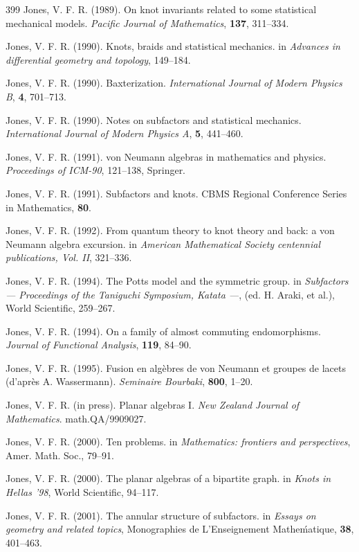 \documentclass[12pt]{article}
\theoremstyle{plain}
\theoremstyle{definition}
\numberwithin{equation}{section}
\begin{document}
\begin{thebibliography} {399}
Jones, V. F. R. (1989).
On knot invariants related to some statistical mechanical models. 
{\em Pacific Journal of Mathematics}, {\bf 137}, 311--334.

Jones, V. F. R. (1990).
Knots, braids and statistical mechanics.
in {\em Advances in differential geometry and topology}, 149--184.

Jones, V. F. R. (1990).
Baxterization.
{\em International Journal of Modern Physics B}, 
{\bf 4}, 701--713.

Jones, V. F. R. (1990).
Notes on subfactors and statistical mechanics.
{\em International Journal of Modern Physics A}, 
{\bf 5}, 441--460.

Jones, V. F. R. (1991).
von Neumann algebras in mathematics and physics.
{\em Proceedings of ICM-90}, 121--138, Springer.

Jones, V. F. R. (1991).
Subfactors and knots.
CBMS Regional Conference Series in Mathematics, 
{\bf 80}.

Jones, V. F. R. (1992).
From quantum theory to knot theory and back:  a von
Neumann algebra  excursion. 
in {\em American Mathematical Society centennial publications, Vol.  II}, 
321--336.

Jones, V. F. R. (1994).
The Potts model and the symmetric group.
in {\em Subfactors ---
Proceedings of the Taniguchi Symposium, Katata ---},
(ed. H. Araki, et al.),
World Scientific, 259--267.

Jones, V. F. R. (1994).
On a family of almost commuting endomorphisms.
{\em Journal of Functional Analysis}, {\bf 119}, 84--90.

Jones, V. F. R. (1995).
Fusion en alg\`ebres de von Neumann et groupes de lacets
(d'apr\`es A. Wassermann).
{\em Seminaire Bourbaki}, 
{\bf 800}, 1--20.

Jones, V. F. R. (in press).
Planar algebras I.
{\em New Zealand Journal of Mathematics}.
math.QA/9909027.

Jones, V. F. R. (2000).
Ten problems.
in {\em Mathematics: frontiers and perspectives},
Amer. Math. Soc., 79--91.

Jones, V. F. R. (2000).
The planar algebras of a bipartite graph.
in {\em Knots in Hellas '98}, World Scientific, 94--117.

Jones, V. F. R. (2001).
The annular structure of subfactors.
in {\em Essays on geometry and related topics},
Monographies de L'Enseignement Mathe\'matique, {\bf 38}, 401--463.


\end{thebibliography}
\end{document}
